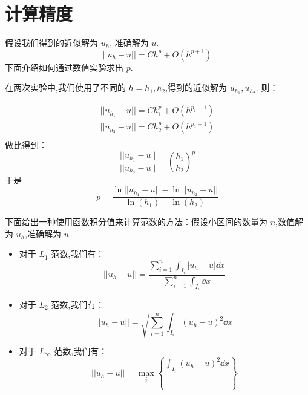 \documentclass{book}
\begin{document}
\section{计算精度}
假设我们得到的近似解为 $u_h$, 准确解为 $u$.
\begin{equation}
  || u_h-u || = Ch^p + O(h^{p+1})
\end{equation}
下面介绍如何通过数值实验求出 $p$.

在两次实验中,我们使用了不同的 $h=h_1,h_2$,得到的近似解为 $u_{h_1},u_{h_2}$. 则：

\begin{equation}
  \begin{aligned}
    || u_{h_1}-u || = Ch_1^p + O(h^{p_1+1}) \\
    || u_{h_2}-u || = Ch_2^p + O(h^{p_2+1}) \\
  \end{aligned}
\end{equation}
做比得到：
\begin{equation}
  \frac{|| u_{h_1}-u ||}{|| u_{h_2}-u ||} = \left(\frac{h_1}{h_2}\right)^p
\end{equation}
于是
\begin{equation}
  p = \frac{\ln|| u_{h_1}-u ||-\ln|| u_{h_2}-u ||}{\ln(h_1)-\ln(h_2)}
\end{equation}

下面给出一种使用函数积分值来计算范数的方法：假设小区间的数量为 $n$,数值解为 $u_h$,准确解为 $u$.
\begin{itemize}
  \item 对于 $L_1$ 范数,我们有：
        \begin{equation}
          || u_{h}-u || = \frac{\sum_{i=1}^{n}\int_{I_i}|u_{h}-u|\dd x }{\sum_{i=1}^{n}\int_{I_i}\dd x}
        \end{equation}

  \item 对于 $L_2$ 范数,我们有：
        \begin{equation}
          || u_{h}-u || = \sqrt{\sum_{i=1}^{n}\int_{I_i}\left(u_{h}-u\right)^2\dd x}
        \end{equation}
  \item 对于 $L_\infty$ 范数,我们有：
        \begin{equation}
          || u_{h}-u || = \max_i \left\{\frac{\int_{I_i}\left(u_{h}-u\right)^2\dd x}{} \right\}
        \end{equation}
\end{itemize}
\end{document}
